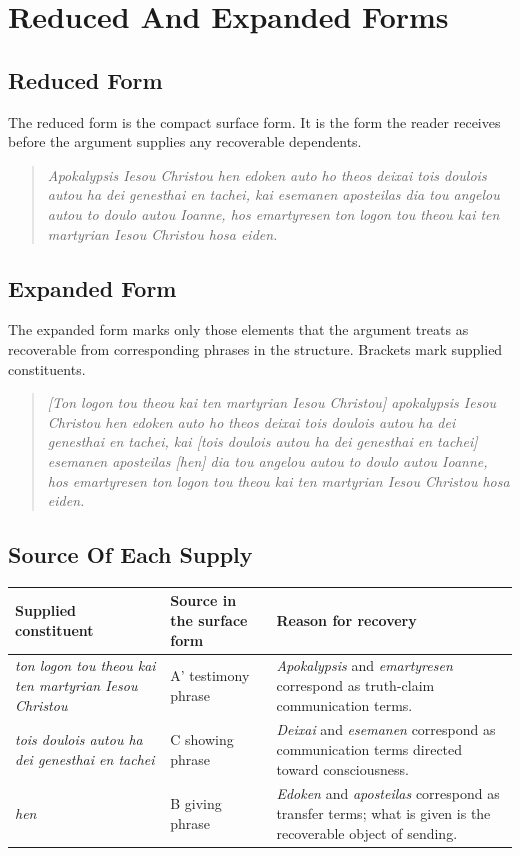 \chapter{Reduced And Expanded Forms}

\section{Reduced Form}

The reduced form is the compact surface form. It is the form the reader receives before the argument supplies any recoverable dependents.

\begin{quote}
\textit{Apokalypsis Iesou Christou hen edoken auto ho theos deixai tois doulois autou ha dei genesthai en tachei, kai esemanen aposteilas dia tou angelou autou to doulo autou Ioanne, hos emartyresen ton logon tou theou kai ten martyrian Iesou Christou hosa eiden.}
\end{quote}

\section{Expanded Form}

The expanded form marks only those elements that the argument treats as recoverable from corresponding phrases in the structure. Brackets mark supplied constituents.

\begin{quote}
\textit{[Ton logon tou theou kai ten martyrian Iesou Christou] apokalypsis Iesou Christou hen edoken auto ho theos deixai tois doulois autou ha dei genesthai en tachei, kai [tois doulois autou ha dei genesthai en tachei] esemanen aposteilas [hen] dia tou angelou autou to doulo autou Ioanne, hos emartyresen ton logon tou theou kai ten martyrian Iesou Christou hosa eiden.}
\end{quote}

\section{Source Of Each Supply}

\begin{center}
\begin{longtable}{@{}L{0.22\textwidth}L{0.34\textwidth}L{0.34\textwidth}@{}}
\toprule
Supplied constituent & Source in the surface form & Reason for recovery \\
\midrule
\textit{ton logon tou theou kai ten martyrian Iesou Christou} & A' testimony phrase & \textit{Apokalypsis} and \textit{emartyresen} correspond as truth-claim communication terms. \\
\textit{tois doulois autou ha dei genesthai en tachei} & C showing phrase & \textit{Deixai} and \textit{esemanen} correspond as communication terms directed toward consciousness. \\
\textit{hen} & B giving phrase & \textit{Edoken} and \textit{aposteilas} correspond as transfer terms; what is given is the recoverable object of sending. \\
\bottomrule
\end{longtable}
\end{center}

